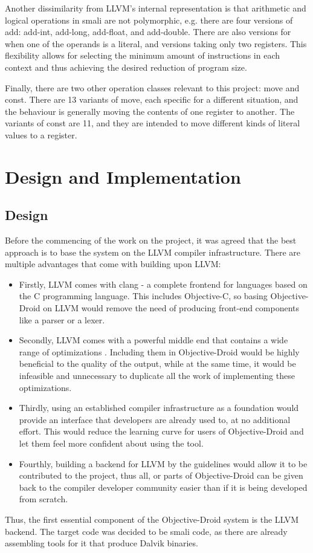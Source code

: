 \documentclass[parskip]{cs4rep}
\begin{document}
Another dissimilarity from LLVM's internal representation is that arithmetic and logical operations in smali are not polymorphic, e.g. there are four versions of add: add-int, add-long, add-float, and add-double. There are also versions for when one of the operands is a literal, and versions taking only two registers. This flexibility allows for selecting the minimum amount of instructions in each context and thus achieving the desired reduction of program size.

Finally, there are two other operation classes relevant to this project: move and const. There are 13 variants of move, each specific for a different situation, and the behaviour is generally moving the contents of one register to another. The variants of const are 11, and they are intended to move different kinds of literal values to a register.

\chapter{Design and Implementation}

\section{Design}

Before the commencing of the work on the project, it was agreed that the best approach is to base the system on the LLVM compiler infrastructure. There are multiple advantages that come with building upon LLVM:
\begin{itemize}
\item
Firstly, LLVM comes with clang - a complete frontend for languages based on the C programming language. This includes Objective-C, so basing Objective-Droid on LLVM would remove the need of producing front-end components like a parser or a lexer.
\item
Secondly, LLVM comes with a powerful middle end that contains a wide range of optimizations \cite{P7}. Including them in Objective-Droid would be highly beneficial to the quality of the output, while at the same time, it would be infeasible and unnecessary to duplicate all the work of implementing these optimizations.
\item
Thirdly, using an established compiler infrastructure as a foundation would provide an interface that developers are already used to, at no additional effort. This would reduce the learning curve for users of Objective-Droid and let them feel more confident about using the tool.
\item
Fourthly, building a backend for LLVM by the guidelines would allow it to be contributed to the project, thus all, or parts of Objective-Droid can be given back to the compiler developer community easier than if it is being developed from scratch.
\end{itemize}
Thus, the first essential component of the Objective-Droid system is the LLVM backend. The target code was decided to be smali code, as there are already assembling tools for it that produce Dalvik binaries.
\end{document}
